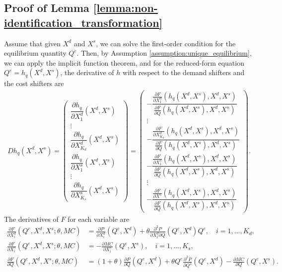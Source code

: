\documentclass[11pt, a4paper]{article}
\theoremstyle{remark}
\begin{document}
\subsection{Proof of Lemma \ref{lemma:non-identification_transformation}}
Assume that given $X^{d}$ and $X^{s}$, we can solve the first-order condition for the equilibrium quantity $Q^e$.
Then, by Assumption \ref{assumption:unique_equilibrium}, we can apply the implicit function theorem, and for the reduced-form equation $Q^e = h_q(X^{d}, X^{s})$, the derivative of $h$ with respect to the demand shifters and the cost shifters are
\begin{align}
    Dh_q(X^{d}, X^{s}) = \begin{pmatrix}
        \dfrac{\partial h_q}{\partial X^{d}_{1}}(X^{d}, X^{s})\\
        \vdots \\
        \dfrac{\partial h_q}{\partial X^{d}_{K_d}}(X^{d}, X^{s})\\[1em]
        \dfrac{\partial h_q}{\partial X^{s}_{1}}(X^{d}, X^{s})\\
        \vdots \\
        \dfrac{\partial h_q}{\partial X^{s}_{K_s}}(X^{d}, X^{s})
    \end{pmatrix} = \begin{pmatrix}
        -\dfrac{\frac{\partial F}{\partial X^{d}_{1}}(h_q(X^{d}, X^{s}), X^{d}, X^{s})}{\frac{\partial F}{\partial Q}(h_q(X^{d}, X^{s}), X^{d}, X^{s})}\\
        \vdots \\
        -\dfrac{\frac{\partial F}{\partial X^{d}_{K_d}}(h_q(X^{d}, X^{s}), X^{d}, X^{s})}{\frac{\partial F}{\partial Q}(h_q(X^{d}, X^{s}), X^{d}, X^{s})}\\[1.5em]
        -\dfrac{\frac{\partial F}{\partial X^{s}_{1}}(h_q(X^{d}, X^{s}), X^{d}, X^{s})}{\frac{\partial F}{\partial Q}(h_q(X^{d}, X^{s}), X^{d}, X^{s})}\\
        \vdots \\        
        -\dfrac{\frac{\partial F}{\partial X^{s}}(h_q(X^{d}, X^{s}), X^{d}, X^{s})}{\frac{\partial F}{\partial Q}(h_q(X^{d}, X^{s}), X^{d}, X^{s})}
    \end{pmatrix}.\label{eq:foc_derivative_demand_supply}
\end{align}
The derivatives of $F$ for each variable are
\begin{align}
    \frac{\partial F}{\partial X^{d}_i}(Q^e, X^{d}, X^{s}; \theta, MC) & =  \frac{\partial P}{\partial X^{d}_{i}}(Q^e, X^{d}) + \theta\frac{\partial^2 P}{\partial X^{d}_{i}\partial Q}(Q^e, X^{d})Q^e, \quad i = 1, \ldots, K_d,\\
    \frac{\partial F}{\partial X^{s}_i}(Q^e, X^{d}, X^{s}; \theta, MC) & =  -\frac{\partial MC}{\partial X^{s}_{i}}(Q^e, X^{s}), \quad i = 1, \ldots, K_s, \\
    \frac{\partial F}{\partial Q}(Q^e, X^{d}, X^{s}; \theta, MC) & = (1+\theta)\frac{\partial P}{\partial Q}(Q^e, X^{d}) + \theta Q^e\frac{\partial^2 P}{\partial Q^2}(Q^e, X^{d}) - \frac{\partial MC}{\partial Q}(Q^e, X^{s}).
\end{align}
\end{document}
